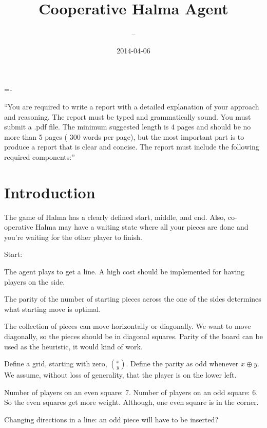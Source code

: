 \documentclass[twocolumn]{article}
\author{\name~--~\id}
\title{Cooperative Halma Agent}
\date{2014-04-06}
\def\xor{\oplus} %
\begin{document}
\abovedisplayskip=-\baselineskip

\maketitle


``You are required to write a report with a detailed explanation of your approach and reasoning. The report must be typed and grammatically sound. You must submit a .pdf file. The minimum suggested length is 4 pages and should be no more than 5 pages ( 300 words per
page), but the most important part is to produce a report that is clear and concise. The report must include the following required components:''

\section{Introduction}

The game of Halma has a clearly defined start, middle, and end. Also, co-operative Halma may have a waiting state where all your pieces are done and you're waiting for the other player to finish.

Start:

The agent plays to get a line. A high cost should be implemented for having players on the side.

The parity of the number of starting pieces across the one of the sides determines what starting move is optimal.

The collection of pieces can move horizontally or diagonally. We want to move diagonally, so the pieces should be in diagonal squares. Parity of the board can be used as the heuristic, it would kind of work.

Define a grid, starting with zero, $\binom{x}{y}$. Define the parity as odd whenever $x \xor y$. We assume, without loss of generality, that the player is on the lower left.

Number of players on an even square: 7. Number of players on an odd square: 6. So the even squares get more weight. Although, one even square is in the corner.

Changing directions in a line: an odd piece will have to be inserted?
\end{document}
